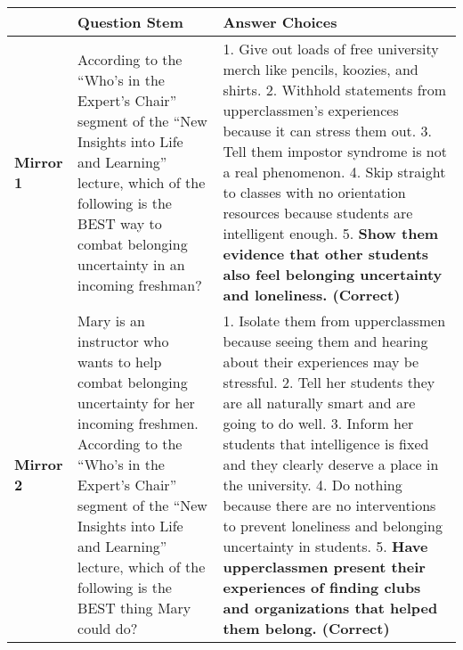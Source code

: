 \documentclass[
]{article}
\begin{document}
\begin{longtable}[]{@{}lll@{}}
\toprule
\begin{minipage}[b]{0.03\columnwidth}\raggedright
\strut
\end{minipage} & \begin{minipage}[b]{0.21\columnwidth}\raggedright
\textbf{Question Stem}\strut
\end{minipage} & \begin{minipage}[b]{0.67\columnwidth}\raggedright
\textbf{Answer Choices}\strut
\end{minipage}\tabularnewline
\midrule
\endhead
\begin{minipage}[t]{0.03\columnwidth}\raggedright
\textbf{Mirror 1}\strut
\end{minipage} & \begin{minipage}[t]{0.21\columnwidth}\raggedright
According to the ``Who's in the Expert's Chair'' segment of the ``New Insights into Life and Learning'' lecture, which of the following is the BEST way to combat belonging uncertainty in an incoming freshman?\strut
\end{minipage} & \begin{minipage}[t]{0.67\columnwidth}\raggedright
1. Give out loads of free university merch like pencils, koozies, and shirts. 2. Withhold statements from upperclassmen's experiences because it can stress them out. 3. Tell them impostor syndrome is not a real phenomenon. 4. Skip straight to classes with no orientation resources because students are intelligent enough. 5. \textbf{Show them evidence that other students also feel belonging uncertainty and loneliness. (Correct)}\strut
\end{minipage}\tabularnewline
\begin{minipage}[t]{0.03\columnwidth}\raggedright
\textbf{Mirror 2}\strut
\end{minipage} & \begin{minipage}[t]{0.21\columnwidth}\raggedright
Mary is an instructor who wants to help combat belonging uncertainty for her incoming freshmen. According to the ``Who's in the Expert's Chair'' segment of the ``New Insights into Life and Learning'' lecture, which of the following is the BEST thing Mary could do?\strut
\end{minipage} & \begin{minipage}[t]{0.67\columnwidth}\raggedright
1. Isolate them from upperclassmen because seeing them and hearing about their experiences may be stressful. 2. Tell her students they are all naturally smart and are going to do well. 3. Inform her students that intelligence is fixed and they clearly deserve a place in the university. 4. Do nothing because there are no interventions to prevent loneliness and belonging uncertainty in students. 5. \textbf{Have upperclassmen present their experiences of finding clubs and organizations that helped them belong. (Correct)}\strut

\end{minipage}
\end{longtable}
\end{document}
